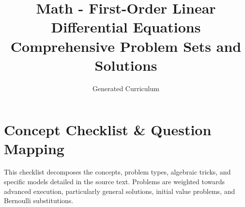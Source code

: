 \documentclass[11pt]{article}
\title{\textbf{Math - First-Order Linear Differential Equations}\\ \large Comprehensive Problem Sets and Solutions}
\author{Generated Curriculum}
\date{}
\begin{document}
\maketitle

\tableofcontents
\newpage

\section{Concept Checklist \& Question Mapping}

This checklist decomposes the concepts, problem types, algebraic tricks, and specific models detailed in the source text. Problems are weighted towards advanced execution, particularly general solutions, initial value problems, and Bernoulli substitutions.
\end{document}
